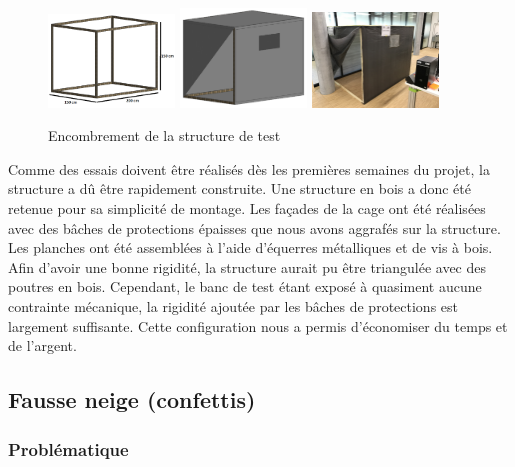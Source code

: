 \begin{figure}[H]
    \centering
    \includegraphics[width=0.3\textwidth]{Images/photos_PGA/P004_CageDeTest21.png}
    \includegraphics[width=0.3\textwidth]{Images/photos_PGA/P004_CageDeTest2.png}
    \includegraphics[width=0.3\textwidth]{Images/photos_PGA/IMG_0442.jpg}
    \caption{Encombrement de la structure de test}
    \label{fig:encombrement}
\end{figure}

Comme des essais doivent être réalisés dès les premières semaines du projet, la structure a dû être
rapidement construite. Une structure en bois a donc été retenue pour sa simplicité de montage. 
Les façades de la cage ont été réalisées avec des bâches de protections épaisses que nous avons aggrafés 
sur la structure. Les planches ont été assemblées à l’aide d’équerres métalliques et de vis à bois.\\
Afin d’avoir une bonne rigidité, la structure aurait pu être triangulée avec des poutres en bois. 
Cependant, le banc de test étant exposé à quasiment aucune contrainte mécanique, la rigidité ajoutée par 
les bâches de protections est largement suffisante. Cette configuration nous a permis d’économiser du 
temps et de l’argent.

\subsection{Fausse neige (confettis)}

\subsubsection{Problématique}

